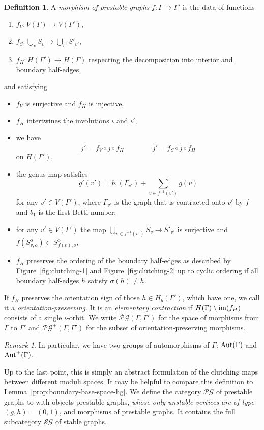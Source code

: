 \documentclass[11pt,psamsfonts, oneside, reqno]{amsart}
\newcommand{\union}[2]{\bigcup\limits_{#1}{#2}}%
\newcommand{\sub}{\subset}%
\newcommand{\sm}{\ensuremath{\setminus}}%
\newcommand{\s}[2]{\sum\limits_{#1}{#2} }
\newcommand{\g}{\circ}%
\newcommand{\inv}{^{-1}}
\newcommand{\cl}{\colon}
\newcommand{\scG}{\mathscr{G}}
\newcommand{\scP}{\mathscr{P}}
\newcommand{\scS}{\mathscr{S}}
\newcommand{\inn}{^\mathrm{o}}
\newcommand{\im}{\normalfont\text{im}}
\newcommand{\Aut}{\normalfont\text{Aut}}
\newcommand{\wt}{\widetilde}
\theoremstyle{definition}
\newtheorem{definition}[theorem]{Definition}
\theoremstyle{remark}
\newtheorem{remark}[theorem]{Remark}
\numberwithin{equation}{section}
\begin{document}
\begin{definition}\label{de:morphism-prestable-graphs} A \emph{morphism of prestable graphs} $f \cl \Gamma\to \Gamma'$ is the data of functions 
	\begin{enumerate}
		\item $f_V \cl V(\Gamma)\to V(\Gamma')$,
		\item $f_S\cl \union{v}{S_v}\to \union{v'}{S'_{v'}}$,
		\item $f_H \cl H(\Gamma')\to H(\Gamma)$ respecting the decomposition into interior and boundary half-edges,
	\end{enumerate} 
	and satisfying
	\begin{itemize}[leftmargin=15pt]
		\item $f_V$ is surjective and $f_H$ is injective,
		\item $f_H$ intertwines the involutions $\iota$ and $\iota'$,
		\item we have 
		\[j' = f_V \g j \g f_H \qquad \qquad \wt j' = f_S \g \wt j \g f_H\]
		on $H(\Gamma')$,
		\item the genus map satisfies $$g'(v') = b_1(\Gamma_{v'}) + \s{v \in f\inv(v')}{g(v)}$$ for any $v'\in V(\Gamma')$, where $\Gamma_{v'}$ is the graph that is contracted onto $v'$ by $f$ and $b_1$ is the first Betti number;
		\item for any $v'\in V(\Gamma')$ the map $\union{v\in f\inv(v')}{S_v}\to S'_{v'}$ is surjective and $f(S\inn_{v,o})\sub S\inn_{f(v),o}$,
		\item $f_H$ preserves the ordering of the boundary half-edges as described by Figure~\ref{fig:clutching-1} and Figure~\ref{fig:clutching-2} up to cyclic ordering if all boundary half-edges $h$ satisfy $\sigma(h) \neq h$.
	\end{itemize} 
	If $f_H$ preserves the orientation sign of those $h \in H_b(\Gamma')$, which have one, we call it a \emph{orientation-preserving}. It is an \emph{elementary contraction} if $H(\Gamma)\sm\im(f_H)$ consists of a single $\iota$-orbit. We write $\scP\scG(\Gamma,\Gamma')$ for the space of morphisms from $\Gamma$ to $\Gamma'$ and $\scP\scG^+(\Gamma,\Gamma')$ for the subset of orientation-preserving morphisms.
\end{definition}

\begin{remark}\label{} In particular, we have two groups of automorphisms of $\Gamma$: $\Aut(\Gamma)$ and $\Aut^+(\Gamma)$.
\end{remark}

Up to the last point, this is simply an abstract formulation of the clutching maps between different moduli spaces. It may be helpful to compare this definition to Lemma~\ref{prop:boundary-base-space-hg}. We define the category $\scP\scG$ of prestable graphs to with objects prestable graphs, \emph{whose only unstable vertices are of type $(g,h) = (0,1)$}, and morphisms of prestable graphs. It contains the full subcategory $\scS\scG$ of stable graphs. 
\end{document}
